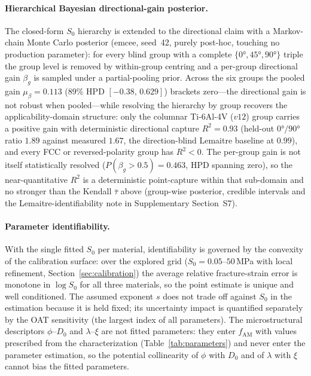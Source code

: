 \paragraph{Hierarchical Bayesian directional-gain posterior.} The closed-form $S_0$ hierarchy is extended to the directional claim with a Markov-chain Monte Carlo posterior (emcee, seed~42, purely post-hoc, touching no production parameter): for every blind group with a complete $\{\ang{0},\ang{45},\ang{90}\}$ triple the group level is removed by within-group centring and a per-group directional gain $\beta_g$ is sampled under a partial-pooling prior. Across the six groups the pooled gain $\mu_\beta = 0.113$ (89\% HPD $[-0.38,\,0.629]$) brackets zero---the directional gain is not robust when pooled---while resolving the hierarchy by group recovers the applicability-domain structure: only the columnar Ti-6Al-4V ($v12$) group carries a positive gain with deterministic directional capture $R^2 = 0.93$ (held-out $\ang{0}/\ang{90}$ ratio $1.89$ against measured $1.67$, the direction-blind Lemaitre baseline at $0.99$), and every FCC or reversed-polarity group has $R^2 < 0$. The per-group gain is not itself statistically resolved ($P(\beta_g > 0.5) = 0.463$, HPD spanning zero), so the near-quantitative $R^2$ is a deterministic point-capture within that sub-domain and no stronger than the Kendall $\bar\tau$ above (group-wise posterior, credible intervals and the Lemaitre-identifiability note in Supplementary Section~S7).

\paragraph{Parameter identifiability.} With the single fitted $S_0$ per material, identifiability is governed by the convexity of the calibration surface: over the explored grid ($S_0 = 0.05$--$50$\,MPa with local refinement, Section~\ref{sec:calibration}) the average relative fracture-strain error is monotone in $\log S_0$ for all three materials, so the point estimate is unique and well conditioned. The assumed exponent $s$ does not trade off against $S_0$ in the estimation because it is held fixed; its uncertainty impact is quantified separately by the OAT sensitivity (the largest index of all parameters). The microstructural descriptors $\phi$--$D_0$ and $\lambda$--$\xi$ are not fitted parameters: they enter $f_{\mathrm{AM}}$ with values prescribed from the characterization (Table~\ref{tab:parameters}) and never enter the parameter estimation, so the potential collinearity of $\phi$ with $D_0$ and of $\lambda$ with $\xi$ cannot bias the fitted parameters.

